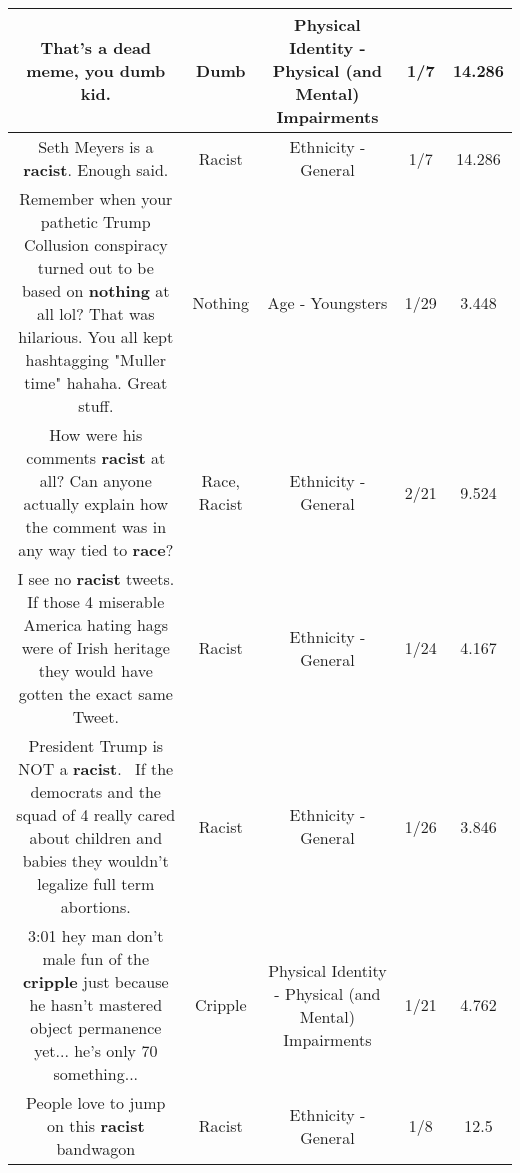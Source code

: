 \documentclass[11pt]{article}
\newlength\mylength
\begin{document}
\begin{center}
\begin{longtable}{|C{.65\mylength}|C{.30\mylength}|C{.12\mylength}|C{.12\mylength}|C{.12\mylength}|}
  \small That's a dead meme, you \textbf{dumb} kid.\normalsize   & Dumb & Physical Identity - Physical (and Mental) Impairments & 1/7 & 14.286 \\  \hline
  \small Seth Meyers is a \textbf{racist}. Enough said.\normalsize   & Racist & Ethnicity - General & 1/7 & 14.286 \\  \hline
  \small Remember when your pathetic Trump Collusion conspiracy turned out to be based on \textbf{nothing} at all lol? That was hilarious. You all kept hashtagging "Muller time" hahaha. Great stuff.\normalsize   & Nothing & Age - Youngsters & 1/29 & 3.448 \\  \hline
  \small How were his comments \textbf{racist} at all? Can anyone actually explain how the comment was in any way tied to \textbf{race}?\normalsize   & Race, Racist & Ethnicity - General & 2/21 & 9.524 \\  \hline
  \small I see no \textbf{racist} tweets. If those 4 miserable America hating hags were of Irish heritage they would have gotten the exact same Tweet.\normalsize   & Racist & Ethnicity - General & 1/24 & 4.167 \\  \hline
  \small President Trump is NOT a \textbf{racist}.  If the democrats and the squad of 4 really cared about children and babies they wouldn't legalize full term abortions.\normalsize   & Racist & Ethnicity - General & 1/26 & 3.846 \\  \hline
  \small 3:01 hey man don't male fun of the \textbf{cripple} just because he hasn't mastered object permanence yet... he's only 70 something...\normalsize   & Cripple & Physical Identity - Physical (and Mental) Impairments & 1/21 & 4.762 \\  \hline
  \small People love to jump on this \textbf{racist} bandwagon\normalsize   & Racist & Ethnicity - General & 1/8 & 12.5 \\  \hline

\end{longtable}
\end{center}
\end{document}
